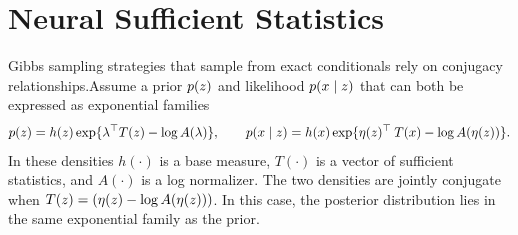 \documentclass[anonymous=false, %
               format=acmsmall, %
               review=true, %
               screen=true, %
               nonacm=true]{acmart}
\theoremstyle{definition}
\begin{document}
\section{Neural Sufficient Statistics}
Gibbs sampling strategies that sample from exact conditionals rely on conjugacy relationships.Assume a prior $p(z ) $ and likelihood $p(x \mid z) $ that can both be expressed as exponential families
\begin{align*}
    p(z ) 
    = 
    h(z) \exp \{ 
        \lambda^\top T(z) 
        - \log A(\lambda) \},
    \qquad
    p(x \mid z) 
    = 
    h(x) \exp \{ 
        \eta(z)^\top \: T(x)  
        -\log A(\eta(z)) \}.
\end{align*}
In these densities $h(\cdot)$ is a base measure, $T(\cdot)$ is a vector of sufficient statistics, and $A(\cdot)$ is a log normalizer. The two densities are jointly conjugate when $T(z) = (\eta(z) -\log A(\eta(z)))$. In this case, the posterior distribution lies in the same exponential family as the prior.
\end{document}

